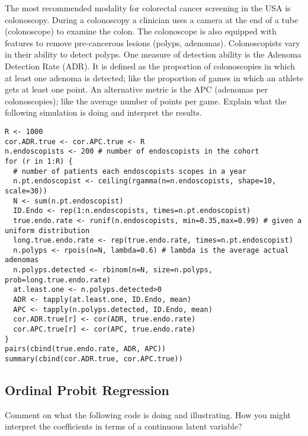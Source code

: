 \documentclass[12pt]{article}
\begin{document}
The most recommended modality for colorectal cancer screening in the USA is colonoscopy. During a colonoscopy a clinician uses a camera at the end of a tube (colonoscope) to examine the colon. The colonoscope is also equipped with features to remove pre-cancerous lesions (polyps, adenomas). Colonoscopists vary in their ability to detect polyps. One measure of detection ability is the Adenoma Detection Rate (ADR). It is defined as the proportion of colonoscopies in which at least one adenoma is detected; like the proportion of games in which an athlete gets at least one point. An alternative metric is the APC (adenomas per colonoscopies); like the average number of points per game. Explain what the following simulation is doing and interpret the results.
\begin{spacing}{1.0}
\begin{lstlisting}  
R <- 1000
cor.ADR.true <- cor.APC.true <- R
n.endoscopists <- 200 # number of endoscopists in the cohort 
for (r in 1:R) {
  # number of patients each endoscopists scopes in a year
  n.pt.endoscopist <- ceiling(rgamma(n=n.endoscopists, shape=10, scale=30))
  N <- sum(n.pt.endoscopist) 
  ID.Endo <- rep(1:n.endoscopists, times=n.pt.endoscopist)
  true.endo.rate <- runif(n.endoscopists, min=0.35,max=0.99) # given a uniform distribution 
  long.true.endo.rate <- rep(true.endo.rate, times=n.pt.endoscopist)
  n.polyps <- rpois(n=N, lambda=0.6) # lambda is the average actual adenomas
  n.polyps.detected <- rbinom(n=N, size=n.polyps, prob=long.true.endo.rate)
  at.least.one <- n.polyps.detected>0
  ADR <- tapply(at.least.one, ID.Endo, mean)
  APC <- tapply(n.polyps.detected, ID.Endo, mean)
  cor.ADR.true[r] <- cor(ADR, true.endo.rate)
  cor.APC.true[r] <- cor(APC, true.endo.rate)
}
pairs(cbind(true.endo.rate, ADR, APC))
summary(cbind(cor.ADR.true, cor.APC.true))
\end{lstlisting}
\end{spacing}


\subsection{Ordinal Probit Regression}

Comment on what the following code is doing and illustrating. How you might interpret the coefficients in terms of a continuous latent variable?
\end{document}
